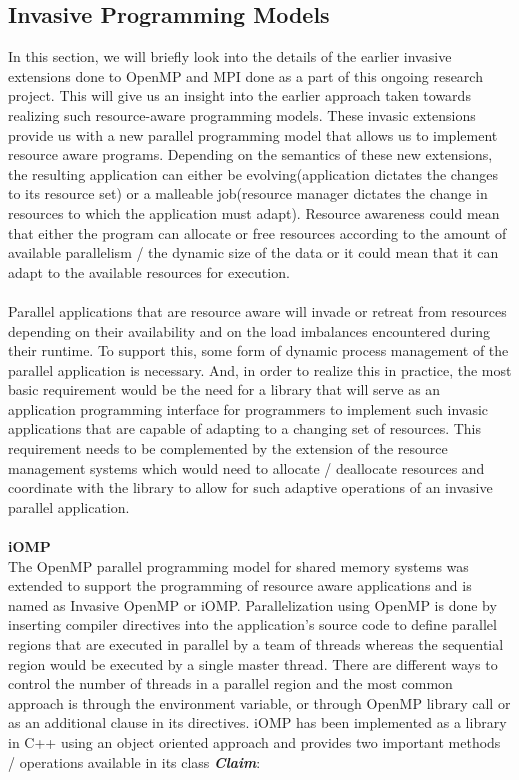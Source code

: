 \subsection{Invasive Programming Models}
In this section, we will briefly look into the details of the earlier invasive extensions done to OpenMP and MPI done as a part of this ongoing research project. This will give us an insight into the earlier approach taken towards realizing such resource-aware programming models. These invasic extensions provide us with a new parallel programming model that allows us to implement resource aware programs. Depending on the semantics of these new extensions, the resulting application can either be evolving(application dictates the changes to its resource set) or a malleable job(resource manager dictates the change in resources to which the application must adapt). Resource awareness could mean that either the program can allocate or free resources according to the amount of available parallelism / the dynamic size of the data or it could mean that it can adapt to the available resources for execution.\\ \\
Parallel applications that are resource aware will invade or retreat from resources depending on their availability and on the load imbalances encountered during their runtime. To support this, some form of dynamic process management of the parallel application is necessary. And, in order to realize this in practice, the most basic requirement would be the need for a library that will serve as an application programming interface for programmers to implement such invasic applications that are capable of adapting to a changing set of resources. This requirement needs to be complemented by the extension of the resource management systems which would need to allocate / deallocate resources and coordinate with the library to allow for such adaptive operations of an invasive parallel application.\\ \\
\textbf{iOMP}\cite{andreas}\\
The OpenMP parallel programming model for shared memory systems was extended to support the programming of resource aware applications and is named as Invasive OpenMP or iOMP. Parallelization using OpenMP is done by inserting compiler directives into the application's source code to define parallel regions that are executed in parallel by a team of threads whereas the sequential region would be executed by a single master thread. There are different ways to control the number of threads in a parallel region and the most common approach is through the environment variable, or through OpenMP library call or as an additional clause in its directives. iOMP has been implemented as a library in C++ using an object oriented approach and provides two important methods / operations available in its class \textbf{\textit{Claim}}:
